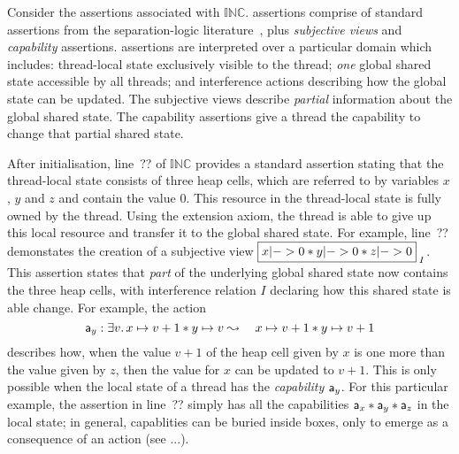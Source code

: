 Consider the \colosl assertions associated with $\mathbb{INC}$.
\colosl assertions comprise of standard assertions from the
separation-logic literature~\cite{rey02,sepish,variablesasresource},
plus {\em subjective views} and {\em capability} assertions. \colosl
assertions are interpreted over a particular domain which includes:
{thread-local} state exclusively visible to the thread; {\em one}
global shared state accessible by all threads; and { interference
actions}  describing how the global state can be updated. The
subjective views describe {\em partial} information about the global
shared state. The capability assertions give a thread the capability
to change that partial shared state.




After
initialisation, line~?? of $\mathbb{INC}$  provides a standard assertion stating that 
the thread-local state consists of three  heap cells,  which are
referred to by  variables $x$,
$y$ and $z$ and contain the value  $0$. This resource in the thread-local state is
fully owned by  the thread. Using the extension axiom, the thread is able to give up  this local
resource and transfer it  to the global shared state. For example, line~?? demonstates the
creation of a subjective view $\shared{x|-> 0 * y|-> 0 * z|->
  0}I$. This assertion states that {\em part} of the underlying
global shared state now contains the three heap cells, with 
interference relation $I$ declaring  how  this shared state  is able 
change. For example,  the action 
\[
 \mathsf{a}_y:  \exists v.\, x \mapsto v+1 * y \mapsto v \mathrel{\leadsto} 
    \quad x \mapsto v+1 * y \mapsto v+1
\]
describes how, when the value $v+1$ of the heap cell given  by   $x$ is one
more than the value given by $z$, then the value for $x$ can be updated
to $v+1$. This is only possible when the
local state of a thread has the {\em capability} $\mathsf{a}_y$. For  this
particular 
example, the assertion in line~?? simply has all the capabilities $\mathsf{a}_x * \mathsf{a}_y * \mathsf{a}_z$   in the local state; in general,
capablities can be buried inside boxes, only to emerge as a
consequence of an action
(see  ...). 

